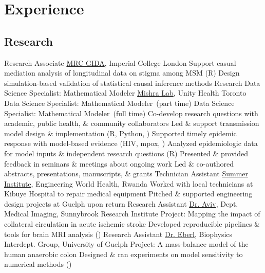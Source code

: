 \section{Experience}\twodate
\subsection{Research}
  {Research Associate}
  {\href{https://www.imperial.ac.uk/mrc-global-infectious-disease-analysis}{MRC GIDA}, Imperial College London}
  \bullet Support casual mediation analysis of longitudinal data on stigma among MSM (R)
  \bullet Design simulation-based validation of statistical causal inference methods
  {Research Data Science Specialist: Mathematical Modeler}
  {\href{http://mishra-lab.ca}{Mishra Lab}, Unity Health Toronto}
  {Data Science Specialist: Mathematical Modeler~\textnormal{(part time)}}{}
  {Data Science Specialist: Mathematical Modeler~\textnormal{(full time)}}{}
  \bullet Co-develop research questions with academic, public health, \& community collaborators
  \bullet Led \& support transmission model design \& implementation (R, Python, \matlab)
  \bullet Supported timely epidemic response with model-based evidence (HIV, mpox, \covid)
  \bullet Analyzed epidemiologic data for model inputs \& independent research questions (R)
  \bullet Presented \& provided feedback in seminars \& meetings about ongoing work
  \bullet Led \& co-authored abstracts, presentations, manuscripts, \& grants
  {Technician Assistant}
  {\href{https://www.ewh.org/the-institutes/summer-institute-programs}{Summer Institute}, Engineering World Health, Rwanda}
  \bullet Worked with local technicians at Kibuye Hospital to repair medical equipment
  \bullet Pitched \& supported engineering design projects at Guelph upon return
  {Research Assistant}
  {\href{https://www.uottawa.ca/brain/people/aviv-richard}{Dr. Aviv}, Dept. Medical Imaging, Sunnybrook Research Institute}
  \bullet Project: Mapping the impact of collateral circulation in acute ischemic stroke
  \bullet Developed reproducible pipelines \& tools for brain MRI analysis (\matlab)
  {Research Assistant}
  {\href{https://www.heberl.uoguelph.ca}{Dr. Eberl}, Biophysics Interdept. Group, University of Guelph}
  \bullet Project: A mass-balance model of the human anaerobic colon
  \bullet Designed \& ran experiments on model sensitivity to numerical methods (\matlab)
\clearpage %
